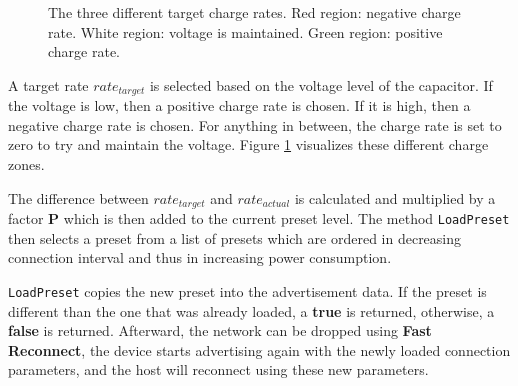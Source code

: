 \begin{figure}
    \begin{center}
    \end{center}
    \caption{The three different target charge rates. Red region: negative charge rate. White region: voltage is maintained. Green region: positive charge rate.}
    \label{fig:select_charge_rate}
\end{figure}

A target rate $rate_{target}$ is selected based on the voltage level of the capacitor. If the voltage is low, then a positive charge rate is chosen. If it is high, then a negative charge rate is chosen. For anything in between, the charge rate is set to zero to try and maintain the voltage. Figure \ref{fig:select_charge_rate} visualizes these different charge zones.

The difference between $rate_{target}$ and $rate_{actual}$ is calculated and multiplied by a factor \textbf{P} which is then added to the current preset level. The method \texttt{LoadPreset} then selects a preset from a list of presets which are ordered in decreasing connection interval and thus in increasing power consumption.

\texttt{LoadPreset} copies the new preset into the advertisement data. If the preset is different than the one that was already loaded, a \textbf{true} is returned, otherwise, a \textbf{false} is returned. Afterward, the network can be dropped using \textbf{Fast Reconnect}, the device starts advertising again with the newly loaded connection parameters, and the host will reconnect using these new parameters.

